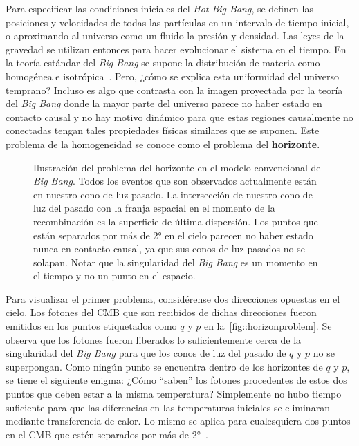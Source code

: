 Para especificar las condiciones iniciales del \textit{Hot Big Bang}, se definen las posiciones y velocidades de todas las partículas en un intervalo de tiempo inicial, o aproximando al universo como un fluido la presión y densidad. Las leyes de la gravedad se utilizan entonces para hacer evolucionar el sistema en el tiempo. En la teoría estándar del \textit{Big Bang} se supone la distribución de materia como homogénea e isotrópica~\cite{baumann2022cosmology}. Pero, ¿cómo se explica esta uniformidad del universo temprano? Incluso es algo que contrasta con la imagen proyectada por la teoría del \textit{Big Bang} donde la mayor parte del universo parece no haber estado en contacto causal y no hay motivo dinámico para que estas regiones causalmente no conectadas tengan tales propiedades físicas similares que se suponen. Este problema de la homogeneidad se conoce como el problema del \textbf{horizonte}.

\begin{figure}[t]
    \centering
    \def\svgwidth{0.75\textwidth}
    
    \caption[Ilustración del problema del horizonte]{Ilustración del problema del horizonte en el modelo convencional del \textit{Big Bang}. Todos los eventos que son observados actualmente están en nuestro cono de luz pasado. La intersección de nuestro cono de luz del pasado con la franja espacial en el momento de la recombinación es la superficie de última dispersión. Los puntos que están separados por más de 2° en el cielo parecen no haber estado nunca en contacto causal, ya que sus conos de luz pasados no se solapan. Notar que la singularidad del \textit{Big Bang} es un momento en el tiempo y no un punto en el espacio.}
    \label{fig::horizonproblem}
\end{figure}
Para visualizar el primer problema, considérense dos direcciones opuestas en el cielo. Los fotones del CMB que son recibidos de dichas direcciones fueron emitidos en los puntos etiquetados como \(q\) y \(p\) en la~\autoref{fig::horizonproblem}. Se observa que los fotones fueron liberados lo suficientemente cerca de la singularidad del \textit{Big Bang} para que los conos de luz del pasado de \(q\) y \(p\) no se superpongan. Como ningún punto se encuentra dentro de los horizontes de \(q\) y \(p\), se tiene el siguiente enigma: ¿Cómo ``saben'' los fotones procedentes de estos dos puntos que deben estar a la misma temperatura? Simplemente no hubo tiempo suficiente para que las diferencias en las temperaturas iniciales se eliminaran mediante transferencia de calor. Lo mismo se aplica para cualesquiera dos puntos en el CMB que estén separados por más de 2°~\cite{baumann2022cosmology}.

